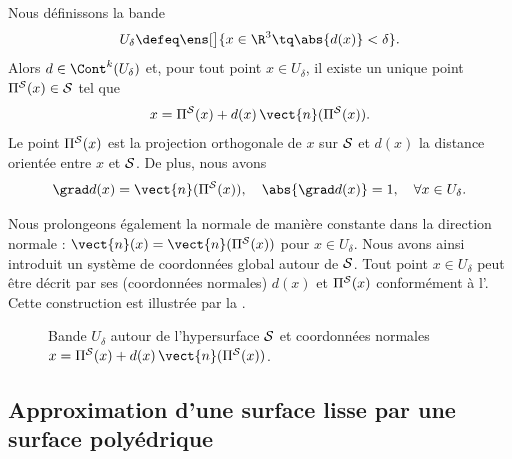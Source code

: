 \begin{lemme} \label{lemme:fermi_coordinates}
Nous définissons la bande
\[
U_\delta \defeq \ens[\big]{x \in \R^{3} \tq \abs{d(x)} < \delta}.
\]
Alors $d \in \Cont^k(U_\delta)$ et, pour tout point $x \in U_\delta$, il existe un unique point $\operatorname{\Pi^{\mathcal{S}}}(x) \in \mathcal{S}$ tel que
\begin{equation} \label{eq:fermi_coordinates}
x = \projvariete(x) + d(x) \, \vect{n}(\projvariete(x)).
\end{equation}
Le point $\operatorname{\Pi^{\mathcal{S}}}(x)$ est la projection orthogonale de $x$ sur $\mathcal{S}$ et $d(x)$ la distance orientée entre $x$ et $\mathcal{S}$. De plus, nous avons
\[
\grad d(x) = \vect{n}(\projvariete(x)), \quad \abs{\grad d(x)} = 1, \quad \forall x \in U_\delta.
\]
\end{lemme}
Nous prolongeons également la normale de manière constante dans la direction normale : $\vect{n}(x) = \vect{n}(\projvariete(x))$ pour $x \in U_\delta$. Nous avons ainsi introduit un système de coordonnées global autour de $\mathcal{S}$. Tout point $x \in U_\delta$ peut être décrit par ses  (coordonnées normales) $d(x)$ et $\operatorname{\Pi^{\mathcal{S}}}(x)$ conformément à l'. Cette construction est illustrée par la .

\begin{figure}[H]
    \centering
    
    \caption{Bande $U_\delta$ autour de l'hypersurface $\mathcal{S}$ et coordonnées normales $x = \projvariete(x) + d(x) \, \vect{n}(\projvariete(x))$.}
    \label{fig:strip_u_delta}
\end{figure}

\subsection{Approximation d'une surface lisse par une surface polyédrique} \label{sec:triangulations}


